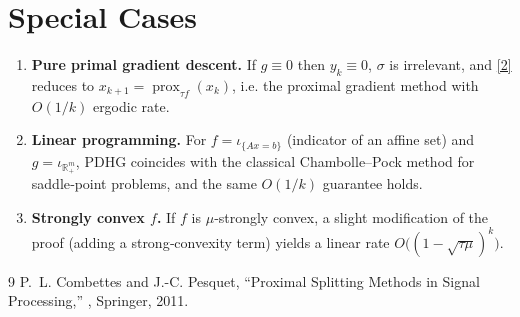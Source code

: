 \documentclass[11pt]{article}
\newcommand{\prox}{\operatorname{prox}}
\begin{document}
\section*{Special Cases}
\begin{enumerate}
\item \textbf{Pure primal gradient descent.} If $g\equiv0$ then $y_{k}\equiv0$, $\sigma$ is irrelevant, and \eqref{2} reduces to $x_{k+1}= \prox_{\tau f}(x_{k})$, i.e. the proximal gradient method with $O(1/k)$ ergodic rate.
\item \textbf{Linear programming.} For $f=\iota_{\{Ax=b\}}$ (indicator of an affine set) and $g=\iota_{\mathbb{R}_{+}^{m}}$, PDHG coincides with the classical Chambolle–Pock method for saddle‑point problems, and the same $O(1/k)$ guarantee holds.
\item \textbf{Strongly convex $f$.} If $f$ is $\mu$‑strongly convex, a slight modification of the proof (adding a strong‑convexity term) yields a linear rate $O\bigl((1-\sqrt{\tau\mu})^{k}\bigr)$.
\end{enumerate}

\begin{thebibliography}{9}
P.~L. Combettes and J.-C. Pesquet,
\newblock ``Proximal Splitting Methods in Signal Processing,''
,
  Springer, 2011.
\end{thebibliography}
\end{document}
